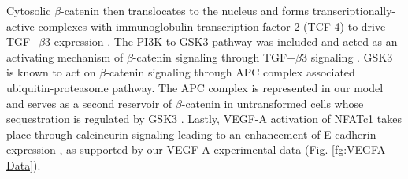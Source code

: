 \documentclass[11pt,letterpaper]{article}
\begin{document}
Cytosolic $\beta$-catenin then translocates to the nucleus and forms transcriptionally-active complexes with immunoglobulin transcription factor 2 (TCF-4)
to drive TGF$-\beta$3 expression \cite{Medici:2008fk}.
The PI3K to GSK3 pathway was included and acted as an activating mechanism of $\beta$-catenin signaling through TGF$-\beta$3 signaling \cite{Medici:2008fk}.
GSK3 is known to act on $\beta$-catenin signaling through APC complex associated ubiquitin-proteasome pathway.
The APC complex is represented in our model and serves as a second reservoir of $\beta$-catenin in untransformed cells whose sequestration is regulated by GSK3 \cite{Zhou:2004kx,Larue:2005vn,Medici:2008fk}.
Lastly, VEGF-A activation of NFATc1 takes place through calcineurin signaling leading to an enhancement of E-cadherin expression \cite{Suehiro:2014aa},
as supported by our VEGF-A experimental data (Fig. \ref{fg:VEGFA-Data}).

\end{document}
